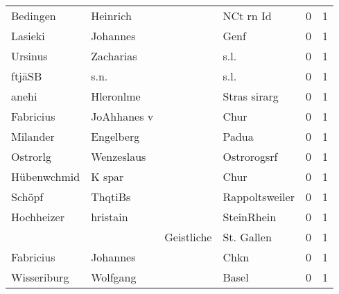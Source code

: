 \begin{tabular}{llllrr}
                 Bedingen &                           Heinrich &             &                                   NCt rn Id &          0 &         1 \\
                  Lasieki &                           Johannes &             &                                        Genf &          0 &         1 \\
                  Ursinus &                          Zacharias &             &                                        s.l. &          0 &         1 \\
                   ftjäSB &                               s.n. &             &                                        s.l. &          0 &         1 \\
                    anehi &                          Hleronlme &             &                                Stras sirarg &          0 &         1 \\
                Fabricius &                        JoAhhanes v &             &                                        Chur &          0 &         1 \\
                 Milander &                          Engelberg &             &                                       Padua &          0 &         1 \\
                 Ostrorlg &                         Wenzeslaus &             &                                 Ostrorogsrf &          0 &         1 \\
              Hübenwchmid &                             K spar &             &                                        Chur &          0 &         1 \\
                   Schöpf &                            ThqtiBs &             &                              Rappoltsweiler &          0 &         1 \\
               Hochheizer &                           hristain &             &                                  SteinRhein &          0 &         1 \\
                          &                                    &  Geistliche &                                  St. Gallen &          0 &         1 \\
                Fabricius &                           Johannes &             &                                        Chkn &          0 &         1 \\
              Wisseriburg &                           Wolfgang &             &                                       Basel &          0 &         1 \\

\end{tabular}
